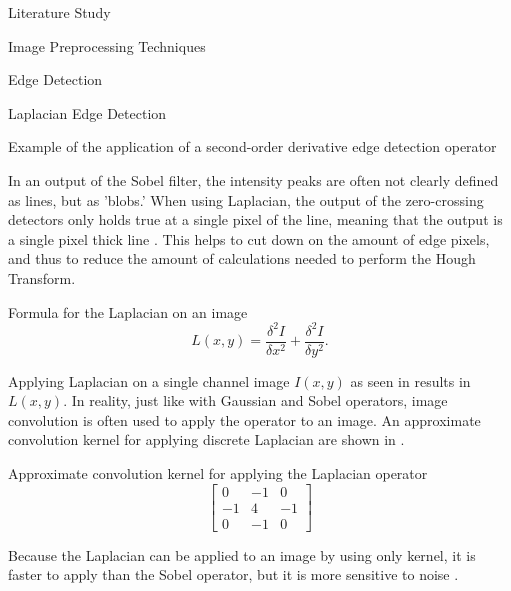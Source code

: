 \documentclass{matthijs}
\begin{document}
\begin{hoofdstuk}{Literature Study}
\begin{paragraaf}{Image Preprocessing Techniques}
\begin{subparagraaf}{Edge Detection}
\begin{subsubparagraaf}{Laplacian Edge Detection}
\begin{figuur}{Example of the application of a second-order derivative edge detection operator}
					\end{figuur}

					\bigskip

					In an output of the Sobel filter, the intensity peaks are often not clearly defined as lines, but as 'blobs.'
					When using Laplacian, the output of the zero-crossing detectors only holds true at a single pixel of the line, meaning that the output is a single pixel thick line \cite{alazzawi2015edge}.
					This helps to cut down on the amount of edge pixels, and thus to reduce the amount of calculations needed to perform the Hough Transform.

					\bigskip

					\begin{figuur}{Formula for the Laplacian on an image}
						\begin{equation*}
							L(x,y) = \frac{\delta^2 I}{\delta x^2} + \frac{\delta^2 I}{\delta y^2}.
						\end{equation*}

						\cite{fisher2003hypermedia}
					\end{figuur}

					Applying Laplacian on a single channel image $I(x,y)$ as seen in  results in $L(x,y)$.
					In reality, just like with Gaussian and Sobel operators, image convolution is often used to apply the operator to an image.
					An approximate convolution kernel for applying discrete Laplacian are shown in .

					\begin{figuur}{Approximate convolution kernel for applying the Laplacian operator}
						\begin{equation*}
							\begin{bmatrix}
								0 & -1 & 0 \\
								-1 & 4 & -1 \\
								0 & -1 & 0
							\end{bmatrix}
						\end{equation*}

						\cite{tai2008fast}
					\end{figuur}

					Because the Laplacian can be applied to an image by using only kernel, it is faster to apply than the Sobel operator, but it is more sensitive to noise \cite{sinha2017sobel}.
				\end{subsubparagraaf}


\end{subparagraaf}
\end{paragraaf}
\end{hoofdstuk}
\end{document}
